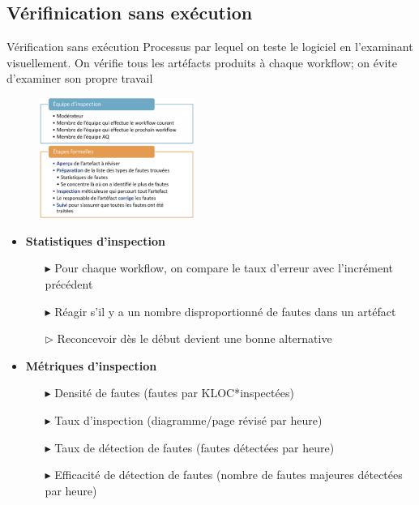 \documentclass[16pt]{report}
\begin{document}
\begin{multicols*}{2}
       \section{Vérifinication sans exécution}


       \begin{Concept}{Vérification sans exécution}{}
           Processus par lequel on teste le logiciel en l'examinant visuellement. On vérifie tous les 
           artéfacts produits à chaque workflow; on évite d'examiner \textcolor{myb}{son propre travail}  
       \end{Concept}


       \begin{figure}[H]
        \begin{center}
            \includegraphics[width=0.45\textwidth]{inspection}
        \end{center}
       \end{figure}

       \begin{itemize}
        \item \textbf{Statistiques d'inspection}  
            \begin{itemize}
                \item[$\blacktriangleright$] Pour chaque workflow, on compare le taux d’erreur avec l’incrément 
                    précédent 
                \item[$\blacktriangleright$] Réagir s’il y a un nombre disproportionné de fautes dans un artéfact
                \item[$\rhd$] Reconcevoir dès le début devient une bonne alternative
            \end{itemize}
        \item \textbf{Métriques d’inspection}  
            \begin{itemize}
                \item[$\blacktriangleright$] Densité de fautes (fautes par KLOC*inspectées)
                \item[$\blacktriangleright$] Taux d’inspection (diagramme/page révisé par heure)
                \item[$\blacktriangleright$] Taux de détection de fautes (fautes détectées par heure)
                \item[$\blacktriangleright$] Efficacité de détection de fautes (nombre de fautes majeures
                        détectées par heure)
            \end{itemize}
       \end{itemize}


\end{multicols*}
\end{document}
